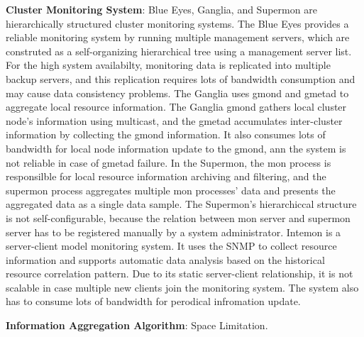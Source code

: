 \documentclass{acm_proc_article-sp}
\begin{document}
\textbf{Cluster Monitoring System}: Blue Eyes\cite{blueeyes}, Ganglia\cite{ganglia}, and Supermon\cite{supermon} are hierarchically structured cluster monitoring systems. 
The Blue Eyes\cite{blueeyes} provides a reliable monitoring system by running multiple management servers, which are construted as a self-organizing hierarchical tree using a management server list. 
For the high system availabilty, monitoring data is replicated into multiple backup servers, and this replication requires lots of bandwidth consumption and may cause data consistency problems.
The Ganglia\cite{ganglia} uses gmond and gmetad to aggregate local resource information. 
The Ganglia gmond gathers local cluster node's information using multicast, and the gmetad accumulates inter-cluster information by collecting the gmond information.
It also consumes lots of bandwidth for local node information update to the gmond, ann the system is not reliable in case of gmetad failure.
In the Supermon\cite{supermon}, the mon process is responsilble for local resource information archiving and filtering, 
and the supermon process aggregates multiple mon processes' data and presents the aggregated data as a single data sample. 
The Supermon's hierarchiccal structure is not self-configurable, because the relation between mon server and supermon server has to be registered manually by a system administrator.
Intemon\cite{intemon} is a server-client model monitoring system. It uses the SNMP to collect resource information and supports automatic data analysis based on the historical resource correlation pattern.
Due to its static server-client relationship, it is not scalable in case multiple new clients join the monitoring system. The system also has to consume lots of bandwidth for perodical infromation update.

\textbf{Information Aggregation Algorithm}: 
Space Limitation. 
\end{document}
